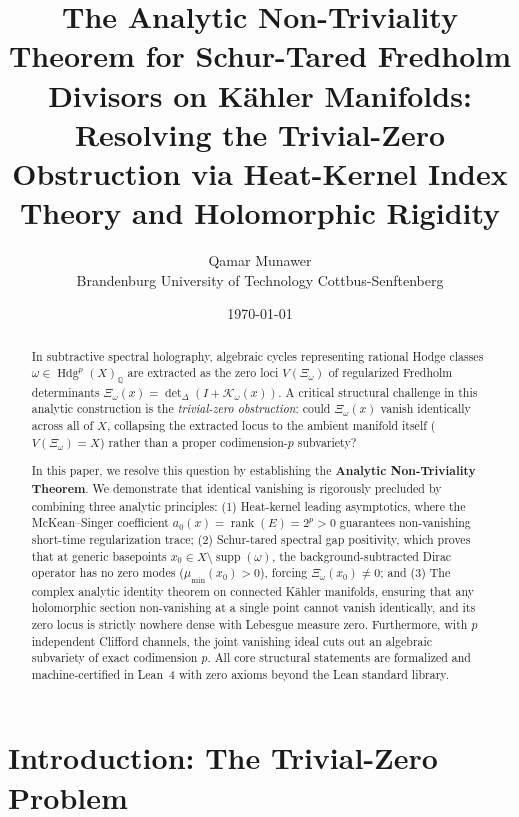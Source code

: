 \documentclass[11pt,a4paper]{article}
\title{\textbf{The Analytic Non-Triviality Theorem for Schur-Tared Fredholm Divisors on K\"ahler Manifolds:\\
Resolving the Trivial-Zero Obstruction via Heat-Kernel Index Theory and Holomorphic Rigidity}}
\author{Qamar Munawer \\ Brandenburg University of Technology Cottbus-Senftenberg}
\date{\today}
\theoremstyle{definition}
\begin{document}
\maketitle

\begin{abstract}
In subtractive spectral holography, algebraic cycles representing rational Hodge classes $\omega \in \operatorname{Hdg}^p(X)_{\mathbb{Q}}$ are extracted as the zero loci $V(\Xi_\omega)$ of regularized Fredholm determinants $\Xi_\omega(x) = \operatorname{det}_{\Delta}(I + \mathcal{K}_\omega(x))$. A critical structural challenge in this analytic construction is the \emph{trivial-zero obstruction}: could $\Xi_\omega(x)$ vanish identically across all of $X$, collapsing the extracted locus to the ambient manifold itself ($V(\Xi_\omega) = X$) rather than a proper codimension-$p$ subvariety? 

In this paper, we resolve this question by establishing the \textbf{Analytic Non-Triviality Theorem}. We demonstrate that identical vanishing is rigorously precluded by combining three analytic principles: (1) Heat-kernel leading asymptotics, where the McKean--Singer coefficient $a_0(x) = \operatorname{rank}(E) = 2^p > 0$ guarantees non-vanishing short-time regularization trace; (2) Schur-tared spectral gap positivity, which proves that at generic basepoints $x_0 \in X \setminus \operatorname{supp}(\omega)$, the background-subtracted Dirac operator has no zero modes ($\mu_{\min}(x_0) > 0$), forcing $\Xi_\omega(x_0) \neq 0$; and (3) The complex analytic identity theorem on connected K\"ahler manifolds, ensuring that any holomorphic section non-vanishing at a single point cannot vanish identically, and its zero locus is strictly nowhere dense with Lebesgue measure zero. Furthermore, with $p$ independent Clifford channels, the joint vanishing ideal cuts out an algebraic subvariety of exact codimension $p$. All core structural statements are formalized and machine-certified in Lean~4 with zero axioms beyond the Lean standard library.
\end{abstract}

\section{Introduction: The Trivial-Zero Problem}
\end{document}
